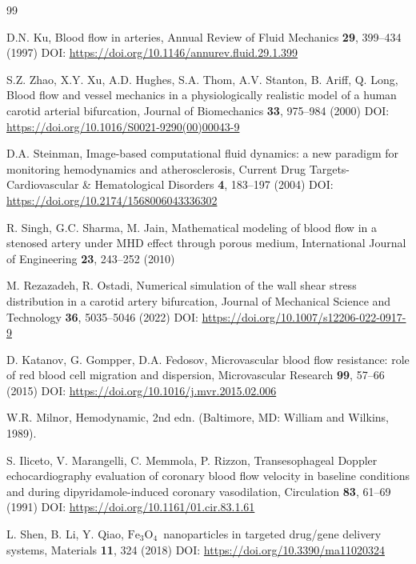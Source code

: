 \documentclass[10pt]{NSP1}
\def\feo{\ensuremath{\mathrm{Fe}_3\mathrm{O}_4}}
\begin{document}
	\begin{thebibliography}{99}
		\footnotesize
		\setlength{\itemsep}{0pt plus 0.2pt}
		\setlength{\parsep}{0pt}
		\setlength{\parskip}{0pt}
		
		D.N. Ku, Blood flow in arteries, Annual Review of Fluid Mechanics \textbf{29}, 399--434 (1997) DOI: \url{https://doi.org/10.1146/annurev.fluid.29.1.399}
		
		S.Z. Zhao, X.Y. Xu, A.D. Hughes, S.A. Thom, A.V. Stanton, B. Ariff, Q. Long, Blood flow and vessel mechanics in a physiologically realistic model of a human carotid arterial bifurcation, Journal of Biomechanics \textbf{33}, 975--984 (2000) DOI: \url{https://doi.org/10.1016/S0021-9290(00)00043-9}
		
		D.A. Steinman, Image-based computational fluid dynamics: a new paradigm for monitoring hemodynamics and atherosclerosis, Current Drug Targets-Cardiovascular \& Hematological Disorders \textbf{4}, 183--197 (2004) DOI: \url{https://doi.org/10.2174/1568006043336302}
		
		R. Singh, G.C. Sharma, M. Jain, Mathematical modeling of blood flow in a stenosed artery under MHD effect through porous medium, International Journal of Engineering \textbf{23}, 243--252 (2010)
		
		M. Rezazadeh, R. Ostadi, Numerical simulation of the wall shear stress distribution in a carotid artery bifurcation, Journal of Mechanical Science and Technology \textbf{36}, 5035--5046 (2022) DOI: \url{https://doi.org/10.1007/s12206-022-0917-9}
		
		D. Katanov, G. Gompper, D.A. Fedosov, Microvascular blood flow resistance: role of red blood cell migration and dispersion, Microvascular Research \textbf{99}, 57--66 (2015) DOI: \url{https://doi.org/10.1016/j.mvr.2015.02.006}
		
		W.R. Milnor, Hemodynamic, 2nd edn. (Baltimore, MD: William and Wilkins, 1989).
		
		S. Iliceto, V. Marangelli, C. Memmola, P. Rizzon, Transesophageal Doppler echocardiography evaluation of coronary blood flow velocity in baseline conditions and during dipyridamole-induced coronary vasodilation, Circulation \textbf{83}, 61--69 (1991) DOI: \url{https://doi.org/10.1161/01.cir.83.1.61}
		
		L. Shen, B. Li, Y. Qiao, \feo\ nanoparticles in targeted drug/gene delivery systems, Materials \textbf{11}, 324 (2018) DOI: \url{https://doi.org/10.3390/ma11020324}
		

\end{thebibliography}
\end{document}

